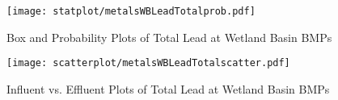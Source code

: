         \begin{figure}[hb]   %
            \centering
            \texttt{[image: statplot/metalsWBLeadTotalprob.pdf]}
            \caption{Box and Probability Plots of Total Lead at Wetland Basin BMPs}
        \end{figure}         %
        
        
        \begin{figure}[hb]   %
            \centering
            \texttt{[image: scatterplot/metalsWBLeadTotalscatter.pdf]}
            \caption{Influent vs. Effluent Plots of Total Lead at Wetland Basin BMPs}
        \end{figure}         %
        \clearpage
        